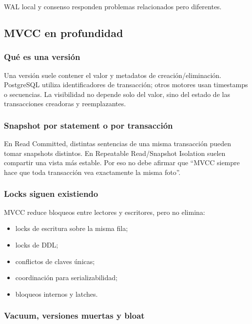 \documentclass[variant=docente,cover=institutional,mode=screen]{ua-engineering-v6-article}
\begin{document}
WAL local y consenso responden problemas relacionados pero diferentes.

\subsection{MVCC en profundidad}

\subsubsection*{Qué es una versión}

Una versión suele contener el valor y metadatos de creación/eliminación. PostgreSQL utiliza identificadores de transacción; otros motores usan timestamps o secuencias. La visibilidad no depende solo del valor, sino del estado de las transacciones creadoras y reemplazantes.

\subsubsection*{Snapshot por statement o por transacción}

En Read Committed, distintas sentencias de una misma transacción pueden tomar snapshots distintos. En Repeatable Read/Snapshot Isolation suelen compartir una vista más estable. Por eso no debe afirmar que ``MVCC siempre hace que toda transacción vea exactamente la misma foto''.

\subsubsection*{Locks siguen existiendo}

MVCC reduce bloqueos entre lectores y escritores, pero no elimina:

\begin{itemize}
\item locks de escritura sobre la misma fila;
\item locks de DDL;
\item conflictos de claves únicas;
\item coordinación para serializabilidad;
\item bloqueos internos y latches.
\end{itemize}

\subsubsection*{Vacuum, versiones muertas y bloat}
\end{document}

